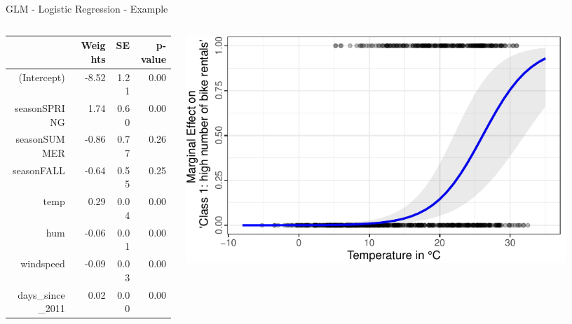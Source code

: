 \documentclass[11pt,compress,t,notes=noshow, aspectratio=169, xcolor=table]{beamer}
\begin{document}
\begin{frame}{GLM - Logistic Regression - Example}
\begin{columns}[T, totalwidth = \textwidth]
\begin{column}{0.55\textwidth}
\centering
\begin{scriptsize}
\begin{tabular}{rrrr}
  \hline
 & Weights & SE & p-value \\ 
  \hline
(Intercept) & -8.52 & 1.21 & 0.00 \\ 
  seasonSPRING & 1.74 & 0.60 & 0.00 \\ 
  seasonSUMMER & -0.86 & 0.77 & 0.26 \\ 
  seasonFALL & -0.64 & 0.55 & 0.25 \\ 
  temp & 0.29 & 0.04 & 0.00 \\ 
  hum & -0.06 & 0.01 & 0.00 \\ 
  windspeed & -0.09 & 0.03 & 0.00 \\ 
  days\_since\_2011 & 0.02 & 0.00 & 0.00 \\ 
   \hline
\end{tabular}
\end{scriptsize}
\pause
\end{column}
\hfill
\begin{column}{0.45\textwidth}
\includegraphics[width = 0.9\textwidth]{figure/logistic_marginal_temp.pdf}
\end{column}
\end{columns}


\end{frame}
\end{document}
